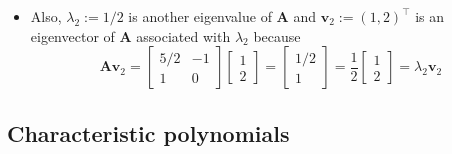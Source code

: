 \documentclass[12pt,a4paper]{article}
\begin{document}
\begin{itemize}
\begin{itemize}
  \item Also,
    $\lambda_{2}:=1/2$ is another eigenvalue of $\bm{A}$
    and $\bm{v}_{2}:=(1, 2)^{\top}$ is an eigenvector of $\bm{A}$ associated with $\lambda_{2}$
    because
    \begin{equation}\nonumber%
      \bm{A}
      \bm{v}_{2}
      = 
      \begin{bmatrix}
        5/2 & -1 \\
        1 & 0
      \end{bmatrix}
      \begin{bmatrix}
        1 \\
        2
      \end{bmatrix}
      = 
      \begin{bmatrix}
        1/2 \\
        1
      \end{bmatrix}
      = \frac{1}{2}
      \begin{bmatrix}
        1 \\
        2
      \end{bmatrix}
      = \lambda_{2}\bm{v}_{2}
    \end{equation}
  \end{itemize}

\end{itemize}

\subsection{Characteristic polynomials}
\end{document}
